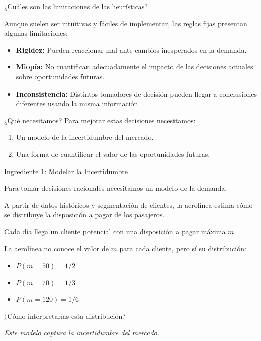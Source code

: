 \documentclass[xcolor=dvipsnames]{beamer}
\begin{document}
\begin{frame}{¿Cuáles son las limitaciones de las heurísticas?}

Aunque suelen ser intuitivas y fáciles de implementar, las reglas fijas presentan algunas limitaciones:

\begin{itemize}
\item \textbf{Rigidez:} Pueden reaccionar mal ante cambios inesperados en la demanda.
\item \textbf{Miopía:} No cuantifican adecuadamente el impacto de las decisiones actuales sobre oportunidades futuras.

\item \textbf{Inconsistencia:} Distintos tomadores de decisión pueden llegar a conclusiones diferentes usando la misma información.


\end{itemize}

\vspace{0.3cm}

\begin{alertblock}{¿Qué necesitamos?}
Para mejorar estas decisiones necesitamos:

\begin{enumerate}
\item Un modelo de la incertidumbre del mercado.
\item Una forma de cuantificar el valor de las oportunidades futuras.
\end{enumerate}
\end{alertblock}

\end{frame}


\begin{frame}{Ingrediente 1: Modelar la Incertidumbre}

Para tomar decisiones racionales necesitamos un modelo de la demanda.

A partir de datos históricos y segmentación de clientes, la aerolínea estima cómo se distribuye la disposición a pagar de los pasajeros.

\vspace{0.2cm}

Cada día llega un cliente potencial con una disposición a pagar máxima $m$.

La aerolínea no conoce el valor de $m$ para cada cliente, pero sí su distribución:

\begin{itemize}
\item $P(m = 50)=1/2$
\item $P(m = 70)=1/3$
\item $P(m = 120)=1/6$
\end{itemize}

\textquestiondown ¿Cómo interpretarías esta distribución?

\vspace{0.2cm}

\textit{Este modelo captura la incertidumbre del mercado.}

\end{frame}
\end{document}
